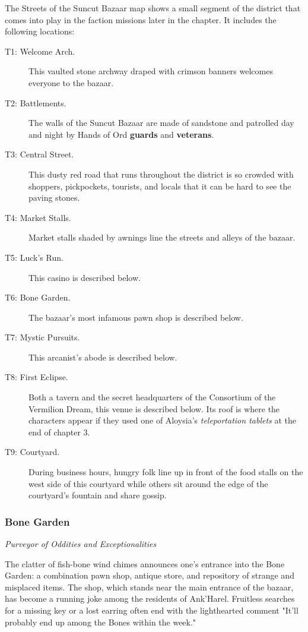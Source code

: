 \documentclass[a4paper, 11pt, bg=full, twocolumn, nooutline]{dndbook}
\begin{document}

The Streets of the Suncut Bazaar map shows a small segment of the district that comes into play in the faction missions later in the chapter. It includes the following locations:

\begin{description}
\item[T1: Welcome Arch.] This vaulted stone archway draped with crimson banners welcomes everyone to the bazaar.
\item[T2: Battlements.] The walls of the Suncut Bazaar are made of sandstone and patrolled day and night by Hands of Ord \textbf{guards} and \textbf{veterans}.
\item[T3: Central Street.] This dusty red road that runs throughout the district is so crowded with shoppers, pickpockets, tourists, and locals that it can be hard to see the paving stones.
\item[T4: Market Stalls.] Market stalls shaded by awnings line the streets and alleys of the bazaar.
\item[T5: Luck's Run.] This casino is described below.
\item[T6: Bone Garden.] The bazaar's most infamous pawn shop is described below.
\item[T7: Mystic Pursuits.] This arcanist's abode is described below.
\item[T8: First Eclipse.] Both a tavern and the secret headquarters of the Consortium of the Vermilion Dream, this venue is described below. Its roof is where the characters appear if they used one of Aloysia's \textit{teleportation tablets} at the end of chapter 3.
\item[T9: Courtyard.] During business hours, hungry folk line up in front of the food stalls on the west side of this courtyard while others sit around the edge of the courtyard's fountain and share gossip.
\end{description}



\subsubsection{Bone Garden}

\textit{Purveyor of Oddities and Exceptionalities}

The clatter of fish-bone wind chimes announces one's entrance into the Bone Garden: a combination pawn shop, antique store, and repository of strange and misplaced items. The shop, which stands near the main entrance of the bazaar, has become a running joke among the residents of Ank'Harel. Fruitless searches for a missing key or a lost earring often end with the lighthearted comment "It'll probably end up among the Bones within the week."
\end{document}
